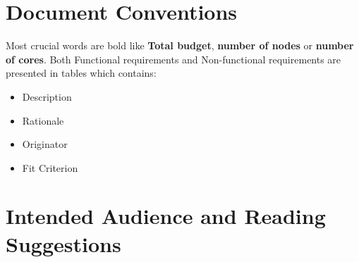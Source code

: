 \documentclass{scrreprt}
\begin{document}
\section{Document Conventions}


Most crucial words are bold like \textbf{Total budget}, \textbf{number of nodes} or \textbf{number of cores}. Both Functional requirements and Non-functional requirements are presented in tables which contains: 
\begin{itemize}
	\item Description
	\item Rationale
	\item Originator 
	\item Fit Criterion
\end{itemize}  


    

\section{Intended Audience and Reading Suggestions}
\end{document}
